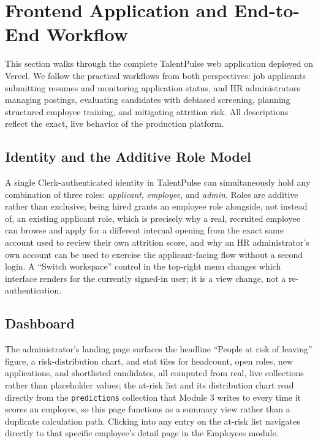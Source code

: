 \documentclass[11pt,a4paper]{article}
\newcommand{\code}[1]{\texttt{\footnotesize #1}}
\begin{document}
\clearpage
\section[Frontend Application Workflow]{Frontend Application and End-to-End Workflow}
\label{sec:frontend}

This section walks through the complete TalentPulse web application deployed on Vercel. We follow the practical workflows from both perspectives: job applicants submitting resumes and monitoring application status, and HR administrators managing postings, evaluating candidates with debiased screening, planning structured employee training, and mitigating attrition risk. All descriptions reflect the exact, live behavior of the production platform.

\subsection{Identity and the Additive Role Model}

A single Clerk-authenticated identity in TalentPulse can simultaneously hold any combination of three roles: \emph{applicant}, \emph{employee}, and \emph{admin}. Roles are additive rather than exclusive; being hired grants an employee role alongside, not instead of, an existing applicant role, which is precisely why a real, recruited employee can browse and apply for a different internal opening from the exact same account used to review their own attrition score, and why an HR administrator's own account can be used to exercise the applicant-facing flow without a second login. A ``Switch workspace'' control in the top-right menu changes which interface renders for the currently signed-in user; it is a view change, not a re-authentication.

\subsection{Dashboard}

The administrator's landing page surfaces the headline ``People at risk of leaving'' figure, a risk-distribution chart, and stat tiles for headcount, open roles, new applications, and shortlisted candidates, all computed from real, live collections rather than placeholder values; the at-risk list and its distribution chart read directly from the \code{predictions} collection that Module 3 writes to every time it scores an employee, so this page functions as a summary view rather than a duplicate calculation path. Clicking into any entry on the at-risk list navigates directly to that specific employee's detail page in the Employees module.
\end{document}
